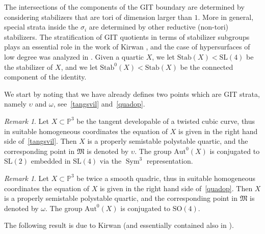 \documentclass[11pt]{amsart}
\numberwithin{equation}{section}
\theoremstyle{plain}
\theoremstyle{remark}
\newtheorem{remark}[theorem]{Remark}
\theoremstyle{definition}
\def\Sym{\operatorname{Sym}}
\newcommand{\Aut}{\mathrm{Aut}}
\newcommand{\Stab}{\mathrm{Stab}}
\newcommand{\SL}{\mathrm{SL}}
\newcommand{\SO}{\mathrm{SO}}
\newcommand{\gM}{\mathfrak{M}}
\newcommand{\PP}{{\mathbb P}}
\begin{document}
The intersections of the components of the GIT boundary are determined by considering stabilizers that are tori of dimension larger than $1$. More in general, special strata inside the $\sigma_i$ are determined by other reductive (non-tori) stabilizers. The stratification of GIT quotients in terms of stabilizer subgroups plays an essential role in the work of Kirwan \cite{kirwan}, and the case of hypersurfaces of low degree  was analyzed in \cite{kirwanhyp}.  Given a quartic $X$, we let $\Stab(X)<\SL(4)$ be the stabilizer of $X$, and we let 
$\Stab^0(X)<\Stab(X)$ be the connected component of the identity. 



We start by noting that we have already defines two points which are GIT strata, namely $\upsilon$ and $\omega$, see~\eqref{tangsvil} and~\eqref{quadop}. 
%
\begin{remark}
%
Let $X\subset\PP^3$ be the tangent developable of a twisted cubic curve, thus in suitable homogeneous coordinates the equation of $X$ is given in the right hand side of~\eqref{tangsvil}. Then $X$ is a properly semistable polystable quartic, and the corresponding point in $\gM$ is denoted by $\upsilon$. The group $\Aut^0(X)$ is conjugated to $\SL(2)$ embedded in 
$\SL(4)$ via the $\Sym^3$ representation. 
%
\end{remark}
%
%
\begin{remark}
%
Let $X\subset\PP^3$ be twice a smooth quadric, thus in suitable homogeneous coordinates the equation of $X$ is given in the right hand side of~\eqref{quadop}. Then $X$ is a properly semistable polystable quartic, and the corresponding point in $\gM$ is denoted by $\omega$. The group $\Aut^0(X)$ is conjugated to $\SO(4)$. 
%
\end{remark}
%
The following result is due to Kirwan (and essentially contained also in \cite{shah4}). 
%
\end{document}

